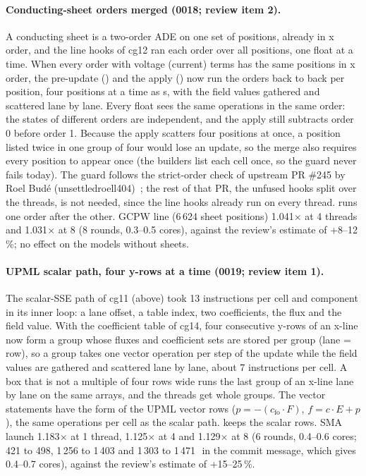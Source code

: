 \paragraph{Conducting-sheet orders merged (0018; review item 2).} A conducting sheet is a two-order ADE on one set of
positions, already in x order, and the line hooks of cg12 ran each order over all positions, one float at a time.
When every order with voltage (current) terms has the same positions in x order, the pre-update
() and the apply () now run
the orders back to back per position, four positions at a time as s, with the field values gathered and
scattered lane by lane. Every float sees the same operations in the same order: the states of different orders are
independent, and the apply still subtracts order 0 before order 1. Because the apply scatters four positions at once, a
position listed twice in one group of four would lose an update, so the merge also requires every position to appear
once (the builders list each cell once, so the guard never fails today). The guard follows the strict-order check of
upstream PR \#245 by Roel Bud\'e (unsettledroell404)~\cite{pr245}; the rest of that PR, the unfused hooks split over
the threads, is not needed, since the line hooks already run on every thread.  runs one
order after the other. GCPW line (6\,624 sheet positions) 1.041$\times$ at 4 threads and 1.031$\times$ at 8 (8 rounds,
0.3--0.5 cores), against the review's estimate of +8--12\,\%; no effect on the models without sheets.

\paragraph{UPML scalar path, four y-rows at a time (0019; review item 1).} The scalar-SSE path of cg11 (above) took 13
instructions per cell and component in its inner loop: a lane offset, a table index, two coefficients, the flux and the
field value. With the coefficient table of cg14, four consecutive y-rows of an x-line now form a group whose fluxes and
coefficient sets are stored per group (lane = row), so a group takes one vector operation per step of the update while
the field values are gathered and scattered lane by lane, about 7 instructions per cell. A box that is not a multiple
of four rows wide runs the last group of an x-line lane by lane on the same arrays, and the threads get whole groups.
The vector statements have the form of the UPML vector rows ($p=-(c_{\text{fo}}\cdot F)$, $f = c\cdot E + p$), the
same operations per cell as the scalar path.  keeps the scalar rows. SMA launch
1.183$\times$ at 1 thread, 1.125$\times$ at 4 and 1.129$\times$ at 8 (6 rounds, 0.4--0.6 cores;
421 to 498, 1\,256 to 1\,403 and 1\,303 to 1\,471\,\MC\ in the commit message, which gives 0.4--0.7 cores), against
the review's estimate of +15--25\,\%.

